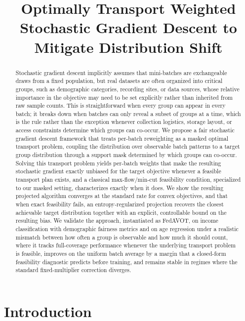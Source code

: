 \documentclass[9pt]{extarticle}
\theoremstyle{definition}
\begin{document}
\title{Optimally Transport Weighted Stochastic Gradient Descent to Mitigate Distribution Shift\vspace{-8pt}}
\maketitle

\begin{abstract}
Stochastic gradient descent implicitly assumes that mini-batches are exchangeable draws from a fixed population, but real datasets are often organized into critical groups, such as demographic categories, recording sites, or data sources, whose relative importance in the objective may need to be set explicitly rather than inherited from raw sample counts. This is straightforward when every group can appear in every batch; it breaks down when batches can only reveal a subset of groups at a time, which is the rule rather than the exception whenever collection logistics, storage layout, or access constraints determine which groups can co-occur. We propose a fair stochastic gradient descent framework that treats per-batch reweighting as a masked optimal transport problem, coupling the distribution over observable batch patterns to a target group distribution through a support mask determined by which groups can co-occur. Solving this transport problem yields per-batch weights that make the resulting stochastic gradient exactly unbiased for the target objective whenever a feasible transport plan exists, and a classical max-flow/min-cut feasibility condition, specialized to our masked setting, characterizes exactly when it does. We show the resulting projected algorithm converges at the standard rate for convex objectives, and that when exact feasibility fails, an entropy-regularized projection recovers the closest achievable target distribution together with an explicit, controllable bound on the resulting bias. We validate the approach, instantiated as FedAVOT, on income classification with demographic fairness metrics and on age regression under a realistic mismatch between how often a group is observable and how much it should count, where it tracks full-coverage performance whenever the underlying transport problem is feasible, improves on the uniform batch average by a margin that a closed-form feasibility diagnostic predicts before training, and remains stable in regimes where the standard fixed-multiplier correction diverges.
\end{abstract}
\section{Introduction}
\end{document}
